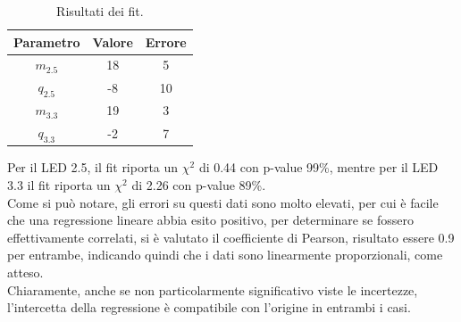 \documentclass[11pt]{article} %
\begin{document}
\begin{table}[!h]
\begin{center}
\begin{tabular}{|c|c|c|}
\hline
\multicolumn{1}{|l|}{Parametro} & \multicolumn{1}{l|}{Valore} & \multicolumn{1}{l|}{Errore}  \\ \hline\hline
$m_{2.5}$                               & 18                      &5                  \\ \hline
$q_{2.5}$                               & -8                     & 10                             \\ \hline \hline
$m_{3.3}$                               & 19                   & 3                       \\ \hline
$q_{3.3}$                               & -2                      & 7                            \\ \hline
\end{tabular}
\end{center}
\caption{Risultati dei fit.}
\end{table}
\newpage
Per il LED 2.5, il fit riporta un $\chi^2$ di 0.44 con p-value 99\%, mentre per il LED 3.3 il fit riporta un $\chi^2$ di 2.26 con p-value 89\%.
\\Come si può notare, gli errori su questi dati sono molto elevati, per cui è facile che una regressione lineare abbia esito positivo, per determinare se fossero effettivamente correlati, si è valutato il coefficiente di Pearson, risultato essere 0.9 per entrambe, indicando quindi che i dati sono linearmente proporzionali, come atteso. \\Chiaramente, anche se non particolarmente significativo viste le incertezze, l'intercetta della regressione è compatibile con l'origine in entrambi i casi.
\end{document}
